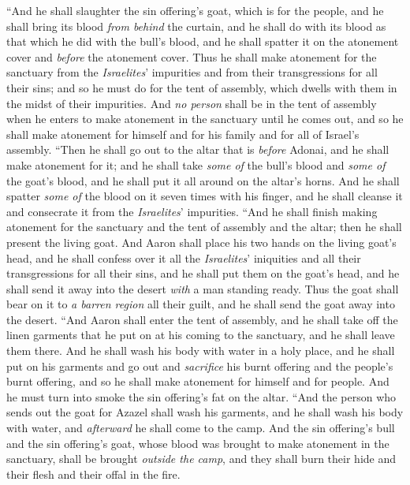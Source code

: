 \begin{biblechapter}
\verse “And he shall slaughter the sin offering’s goat, which is for the people, and he shall bring its blood \textit{from behind} the curtain, and he shall do with its blood as that which he did with the bull’s blood, and he shall spatter it on the atonement cover and \textit{before} the atonement cover.
\verse Thus he shall make atonement for the sanctuary from the \textit{Israelites}’ impurities and from their transgressions for all their sins; and so he must do for the tent of assembly, which dwells with them in the midst of their impurities.
\verse And \textit{no person} shall be in the tent of assembly when he enters to make atonement in the sanctuary until he comes out, and so he shall make atonement for himself and for his family and for all of Israel’s assembly.
\verse “Then he shall go out to the altar that is \textit{before} Adonai, and he shall make atonement for it; and he shall take \textit{some of} the bull’s blood and \textit{some of} the goat’s blood, and he shall put it all around on the altar’s horns.
\verse And he shall spatter \textit{some of} the blood on it seven times with his finger, and he shall cleanse it and consecrate it from the \textit{Israelites}’ impurities.
\verse “And he shall finish making atonement for the sanctuary and the tent of assembly and the altar; then he shall present the living goat.
\verse And Aaron shall place his two hands on the living goat’s head, and he shall confess over it all the \textit{Israelites}’ iniquities and all their transgressions for all their sins, and he shall put them on the goat’s head, and he shall send it away into the desert \textit{with} a man standing ready.
\verse Thus the goat shall bear on it to \textit{a barren region} all their guilt, and he shall send the goat away into the desert.
\verse “And Aaron shall enter the tent of assembly, and he shall take off the linen garments that he put on at his coming to the sanctuary, and he shall leave them there.
\verse And he shall wash his body with water in a holy place, and he shall put on his garments and go out and \textit{sacrifice} his burnt offering and the people’s burnt offering, and so he shall make atonement for himself and for people.
\verse And he must turn into smoke the sin offering’s fat on the altar.
\verse “And the person who sends out the goat for Azazel shall wash his garments, and he shall wash his body with water, and \textit{afterward} he shall come to the camp.
\verse And the sin offering’s bull and the sin offering’s goat, whose blood was brought to make atonement in the sanctuary, shall be brought \textit{outside the camp}, and they shall burn their hide and their flesh and their offal in the fire.

\end{biblechapter}
